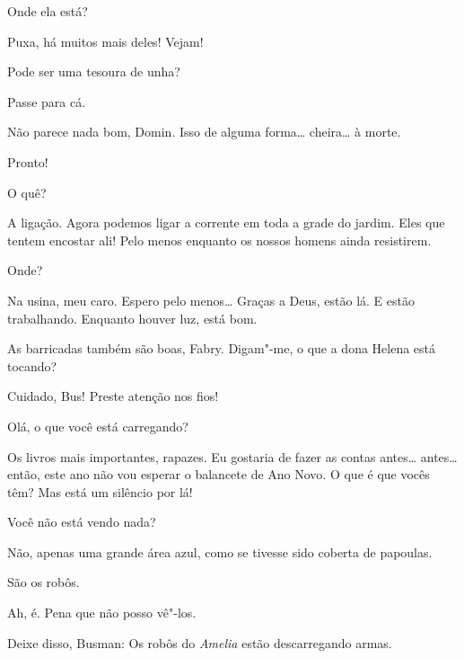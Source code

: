  Onde ela está? 

  Puxa, há muitos mais deles! Vejam!

 Pode ser uma tesoura de unha?

 Passe para cá. 

  Não parece nada bom, Domin. Isso de alguma
forma\ldots{} cheira\ldots{} à morte.

 Pronto!

 O quê?

 A ligação. Agora podemos ligar a corrente em toda a grade do jardim. Eles que tentem
encostar ali! Pelo menos enquanto os nossos homens ainda resistirem.

 Onde?

 Na usina, meu caro. Espero pelo menos\ldots{}  Graças a Deus, estão lá. E estão trabalhando.
 Enquanto houver luz, está bom.

  As barricadas também são boas, Fabry.
Digam"-me, o que a dona Helena está tocando? 

 Cuidado, Bus! Preste atenção nos fios!

 Olá, o que você está carregando?

  Os livros mais importantes, rapazes.
Eu gostaria de fazer as contas antes\ldots{} antes\ldots{} então, este ano não vou esperar
o balancete de Ano Novo. O que é que vocês têm? 
Mas está um silêncio por lá!

 Você não está vendo nada?

 Não, apenas uma grande área azul, como se tivesse sido coberta de
papoulas.

 São os robôs.

 Ah, é. Pena que não posso vê"-los. 

 Deixe disso, Busman: Os robôs do \textit{Amelia} estão descarregando armas.

